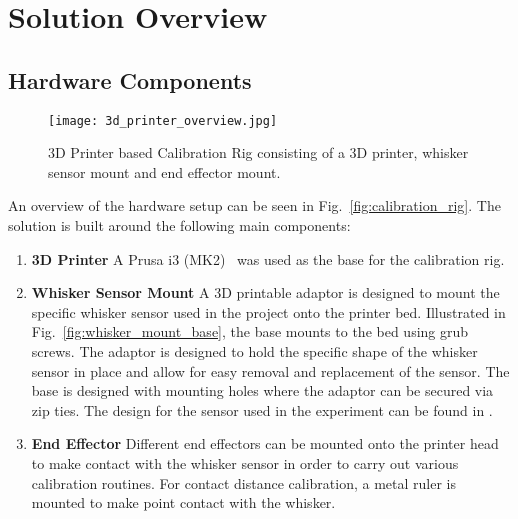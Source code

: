 \documentclass[runningheads]{llncs}
\begin{document}
\section{Solution Overview}

\subsection{Hardware Components}

\begin{wrapfigure}{r}{0.4\textwidth}
    \centering
    \texttt{[image: 3d\_printer\_overview.jpg]}
    \caption{3D Printer based Calibration Rig consisting of a 3D printer, whisker sensor mount and end effector mount.}
    \vspace{-5pt}
    \label{fig:calibration_rig_overview}
\end{wrapfigure}

An overview of the hardware setup can be seen in Fig.~\ref{fig:calibration_rig}. The solution is built around the following main components:

\begin{enumerate}
    \item \textbf{3D Printer} A Prusa i3 (MK2)~\cite{OriginalPrusaI3} was used as the base for the calibration rig.
    \item \textbf{Whisker Sensor Mount} A 3D printable adaptor is designed to mount the specific whisker sensor used in the project onto the printer bed. Illustrated in Fig.~\ref{fig:whisker_mount_base}, the base mounts to the bed using grub screws. The adaptor is designed to hold the specific shape of the whisker sensor in place and allow for easy removal and replacement of the sensor. The base is designed with mounting holes where the adaptor can be secured via zip ties. The design for the sensor used in the experiment can be found in \cite{FoRGroup1OpenWhisker2024}.
    \item \textbf{End Effector} Different end effectors can be mounted onto the printer head to make contact with the whisker sensor in order to carry out various calibration routines. For contact distance calibration, a metal ruler is mounted to make point contact with the whisker.
\end{enumerate}
\end{document}
